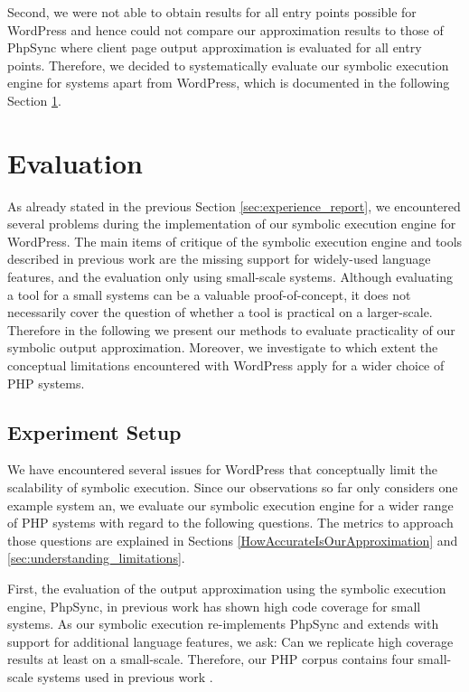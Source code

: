 \documentclass[sigconf]{acmart}
\renewcommand{\sf}[1]{\textsf{#1}}
\begin{document}
Second, we were not able to obtain results for all entry points possible for
\sf{WordPress} and hence could not compare our approximation results to those of
\sf{PhpSync} where client page output approximation is evaluated for all entry points. Therefore, we decided to
systematically evaluate our symbolic execution engine for systems apart from
\sf{WordPress}, which is documented in the following Section
\ref{sec:evaluation}.

\section{Evaluation} \label{sec:evaluation}
As already stated in the previous Section \ref{sec:experience_report}, we
encountered several problems during the implementation of our symbolic
execution engine for \sf{WordPress}. The main items of critique of the symbolic
execution engine and tools described in previous work
\cite{Nguyen:2011:AFH:2190078.2190142,Nguyen:2014:BCG:2635868.2635928,Nguyen:2015:CPS:2786805.2786872,Nguyen:2015:VIS:2819009.2819140}
are the missing support for widely-used language features, and the evaluation
only using small-scale systems. Although evaluating a tool for a small systems
can be a valuable proof-of-concept, it does not necessarily cover the question
of whether a tool is practical on a larger-scale. Therefore in the following we
present our methods to evaluate practicality of our symbolic output
approximation. Moreover, we investigate to which extent the conceptual limitations encountered
with \sf{WordPress} apply for a wider choice of PHP systems.

\subsection{Experiment Setup} \label{sec:experiment_setup}
We have encountered several issues for \sf{WordPress} that conceptually limit
the scalability of symbolic execution. Since our observations so far only considers
one example system an, we evaluate our symbolic execution engine for a wider
range of PHP systems with regard to the following questions. The metrics to
approach those questions are explained in Sections
\ref{HowAccurateIsOurApproximation} and \ref{sec:understanding_limitations}.

First, the evaluation of the output approximation using the symbolic execution
engine, \sf{PhpSync}, in previous work \cite{Nguyen:2014:BCG:2635868.2635928}
has shown high code coverage for small systems. As our symbolic execution
re-implements \sf{PhpSync} and extends with support for additional language
features, we ask: Can  we replicate high coverage results at least on a
small-scale. Therefore, our PHP corpus contains four small-scale systems used
in previous work \cite{Nguyen:2014:BCG:2635868.2635928}.
\end{document}
